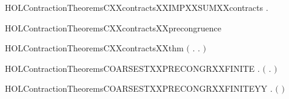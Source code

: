 \begin{SaveVerbatim}{HOLContractionTheoremsCXXcontractsXXIMPXXSUMXXcontracts}
\HOLTokenTurnstile{} \HOLSymConst{\HOLTokenForall{}} .    \HOLSymConst{\HOLTokenImp{}}   
\end{SaveVerbatim}
\newcommand{\HOLContractionTheoremsCXXcontractsXXIMPXXSUMXXcontracts}{\UseVerbatim{HOLContractionTheoremsCXXcontractsXXIMPXXSUMXXcontracts}}
\begin{SaveVerbatim}{HOLContractionTheoremsCXXcontractsXXprecongruence}
\HOLTokenTurnstile{}  
\end{SaveVerbatim}
\newcommand{\HOLContractionTheoremsCXXcontractsXXprecongruence}{\UseVerbatim{HOLContractionTheoremsCXXcontractsXXprecongruence}}
\begin{SaveVerbatim}{HOLContractionTheoremsCXXcontractsXXthm}
\HOLTokenTurnstile{}  \HOLSymConst{\ensuremath{=}} \ensuremath{(}\HOLTokenLambda{} . \HOLSymConst{\HOLTokenForall{}}.   \HOLSymConst{\HOLTokenImp{}}     \ensuremath{)}
\end{SaveVerbatim}
\newcommand{\HOLContractionTheoremsCXXcontractsXXthm}{\UseVerbatim{HOLContractionTheoremsCXXcontractsXXthm}}
\begin{SaveVerbatim}{HOLContractionTheoremsCOARSESTXXPRECONGRXXFINITE}
\HOLTokenTurnstile{} \HOLSymConst{\HOLTokenForall{}} .
       \HOLSymConst{\HOLTokenConj{}}   \HOLSymConst{\HOLTokenImp{}}
     \ensuremath{(}   \HOLSymConst{\HOLTokenEquiv{}} \HOLSymConst{\HOLTokenForall{}}.  \HOLSymConst{\ensuremath{+}}    \HOLSymConst{\ensuremath{+}} \ensuremath{)}
\end{SaveVerbatim}
\newcommand{\HOLContractionTheoremsCOARSESTXXPRECONGRXXFINITE}{\UseVerbatim{HOLContractionTheoremsCOARSESTXXPRECONGRXXFINITE}}
\begin{SaveVerbatim}{HOLContractionTheoremsCOARSESTXXPRECONGRXXFINITEYY}
\HOLTokenTurnstile{} \HOLSymConst{\HOLTokenForall{}} .
       \HOLSymConst{\HOLTokenConj{}}   \HOLSymConst{\HOLTokenImp{}}
     \ensuremath{(}   \HOLSymConst{\HOLTokenEquiv{}}   \ensuremath{)}
\end{SaveVerbatim}
